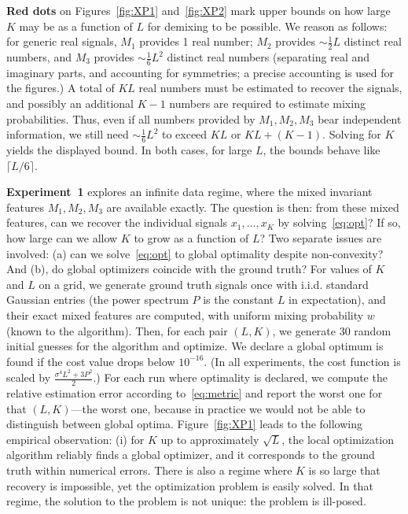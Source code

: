\documentclass[english]{article}
\numberwithin{equation}{section}
\numberwithin{figure}{section}
\theoremstyle{plain}
\theoremstyle{definition}
\theoremstyle{remark}
\theoremstyle{plain}
\theoremstyle{remark}
\theoremstyle{plain}
\theoremstyle{plain}
\begin{document}
\textbf{Red dots} on Figures~\ref{fig:XP1} and~\ref{fig:XP2} mark upper bounds on how large $K$ may be as a function of $L$ for demixing to be possible. We reason as follows: for generic real signals, $M_1$ provides 1 real number; $M_2$ provides $\sim \frac{1}{2}L$ distinct real numbers, and $M_3$ provides $\sim\frac{1}{6}L^2$ distinct real numbers (separating real and imaginary parts, and accounting for symmetries; a precise accounting is used for the figures.) A total of $KL$ real numbers must be estimated to recover the signals, and possibly an additional $K-1$ numbers are required to estimate mixing probabilities. Thus, even if all numbers provided by $M_1, M_2, M_3$ bear independent information, we still need $\sim\frac{1}{6}L^2$ to exceed $KL$ or $KL+(K-1)$. Solving for $K$ yields the displayed bound. In both cases, for large $L$, the bounds behave like $\lceil L/6 \rceil$. %

\textbf{Experiment~1} explores an infinite data regime, where the mixed invariant features $M_1, M_2, M_3$ are available exactly. The question is then: from these mixed features, can we recover the individual signals $x_1, \ldots, x_K$ by solving~\eqref{eq:opt}? If so, how large can we allow $K$ to grow as a function of $L$? Two separate issues are involved: (a) can we solve~\eqref{eq:opt} to global optimality despite non-convexity? And (b), do global optimizers coincide with the ground truth?
For values of $K$ and $L$ on a grid, we generate ground truth signals once with i.i.d. standard Gaussian entries (the power spectrum $P$ is the constant $L$ in expectation), and their exact mixed features are computed, with uniform mixing probability $w$ (known to the algorithm). Then, for each pair $(L, K)$, we generate 30 random initial guesses for the algorithm and optimize. We declare a global optimum is found if the cost value drops below $10^{-16}$. (In all experiments, the cost function is scaled by $\frac{\sigma^4L^2 + 3P^2}{2}$.) For each run where optimality is declared, we compute the relative estimation error according to~\eqref{eq:metric} and report the worst one for that $(L, K)$---the worst one, because in practice we would not be able to distinguish between global optima. %
Figure~\ref{fig:XP1} leads to the following empirical observation: (i) for $K$ up to approximately $\sqrt{L}$, the local optimization algorithm reliably finds a global optimizer, and it corresponds to the ground truth within numerical errors. There is also a regime where $K$ is so large that recovery is impossible, yet the optimization problem is easily solved.
In that regime, the solution to the problem is not unique: the problem is ill-posed.
\end{document}
